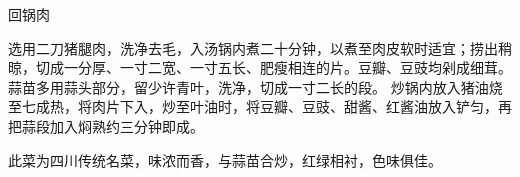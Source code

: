\begin{recipe}{回锅肉}

\ingredients


\cooking

\step 选用二刀猪腿肉，洗净去毛，入汤锅内煮二十分钟，以煮至肉皮软时适宜；捞出稍晾，切成一分厚、一寸二宽、一寸五长、肥瘦相连的片。豆瓣、豆豉均剁成细茸。蒜苗多用蒜头部分，留少许青叶，洗净，切成一寸二长的段。
\step 炒锅内放入猪油烧至七成热，将肉片下入，炒至叶油时，将豆瓣、豆豉、甜酱、红酱油放入铲匀，再把蒜段加入焖熟约三分钟即成。

\notes

此菜为四川传统名菜，味浓而香，与蒜苗合炒，红绿相衬，色味俱佳。

\end{recipe}

